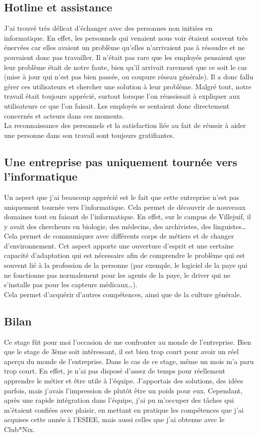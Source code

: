 \subsection{Hotline et assistance}
J'ai trouvé très délicat d'échanger avec des personnes non initiées en informatique. En effet, les personnels qui venaient nous voir étaient souvent très énervées car elles avaient un problème qu'elles n'arrivaient pas à résoudre et ne pouvaient donc pas travailler. Il n'était pas rare que les employés pensaient que leur problème était de notre faute, bien qu'il arrivait rarement que ce soit le cas (mise à jour qui n'est pas bien passée, ou coupure réseau générale). Il a donc fallu gérer ces utilisateurs et chercher une solution à leur problème. Malgré tout, notre travail était toujours apprécié, surtout lorsque l'on réussissait à expliquer aux utilisateurs ce que l'on faisait. Les employés se sentaient donc directement concernés et acteurs dans ces moments.\\
La reconnaissance des personnels et la satisfaction liée au fait de réussir à aider une personne dans son travail sont toujours gratifiantes.

\subsection{Une entreprise pas uniquement tournée vers l'informatique}
Un aspect que j'ai beaucoup apprécié est le fait que cette entreprise n'est pas uniquement tournée vers l'informatique. Cela permet de découvrir de nouveaux domaines tout en faisant de l'informatique. En effet, sur le campus de Villejuif, il y avait des chercheurs en biologie, des médecins, des archivistes, des linguistes\dots \\
Cela permet de communiquer avec différents corps de métiers et de changer d'environnement. Cet aspect apporte une ouverture d'esprit et une certaine capacité d'adaptation qui est nécessaire afin de comprendre le problème qui est souvent lié à la profession de la personne (par exemple, le logiciel de la paye qui ne fonctionne pas normalement pour les agents de la paye, le driver qui ne s'installe pas pour les capteurs médicaux\dots). \\
Cela permet d'acquérir d'autres compétences, ainsi que de la culture générale.

\subsection{Bilan}
Ce stage fût pour moi l'occasion de me confronter au monde de l'entreprise. Bien que le stage de 3ème soit intéressant, il est bien trop court pour avoir un réel aperçu du monde de l'entreprise. Dans le cas de ce stage, même un mois m'a paru trop court. En effet, je n'ai pas disposé d'assez de temps pour réellement apprendre le métier et être utile à l'équipe. J'apportais des solutions, des idées parfois, mais j'avais l'impression de plutôt être un poids pour eux. Cependant, après une rapide intégration dans l'équipe, j'ai pu m'occuper des tâches qui m'étaient confiées avec plaisir, en mettant en pratique les compétences que j'ai acquises cette année à l'ESIEE, mais aussi celles que j'ai obtenue avec le Club*Nix.
